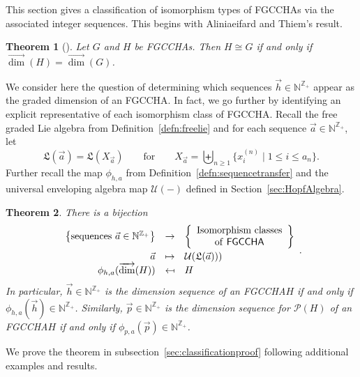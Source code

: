 \documentclass[11pt]{amsart}
\newtheorem{theorem}{Theorem}[section]
\theoremstyle{definition}
\numberwithin{equation}{section}
\def\NN{{\mathbb N}}
\def\ZZ{{\mathbb Z}}
\newcommand{\FGCCHA}{\textsf{FGCCHA}\xspace}
\newcommand{\FGCCHAs}{\textsf{FGCCHA}s\xspace}
\newcommand{\vecdim}{\overrightarrow{\dim}}
\begin{document}
This section gives a classification of isomorphism types of \FGCCHAs via the associated integer sequences.  
This begins with Aliniaeifard and Thiem's result.

\begin{theorem}[{\cite[Theorem 4.2]{AT22}}]
\label{thm:AT}
Let $G$ and $H$ be \FGCCHAs.  Then $H \cong G$ if and only if $\vecdim(H) = \vecdim(G)$.
\end{theorem}

We consider here the question of determining which sequences $\vec{h} \in \NN^{\ZZ_+}$
appear as the graded dimension of an \FGCCHA.  In fact,
we go further by identifying an explicit representative of each isomorphism class of \FGCCHA.  
Recall the free graded Lie algebra from Definition~\ref{defn:freelie} and for each sequence $\vec{a} \in \NN^{\ZZ_{+}}$, let
\begin{equation}
\label{eq:La}
\mathfrak{L}(\vec{a}) = \mathfrak{L}(X_{\vec{a}}) \qquad\text{for}\qquad X_{\vec{a}} = \biguplus_{n \ge 1} \{x^{(n)}_{i} \;|\; 1 \le i \le a_{n}\}.
\end{equation}
Further recall the map $\phi_{h, a}$ from
Definition~\ref{defn:sequencetransfer} and the universal enveloping
algebra map $\mathcal{U}(-)$ defined in Section~\ref{sec:HopfAlgebra}.

\begin{theorem}
\label{thm:a sequence}
There is a bijection
\[
\begin{array}{rcl}
\left\{ \text{sequences }\vec{a} \in \NN^{\ZZ_+} \right\} & \to & \left\{ \begin{array}{c} \text{Isomorphism classes} \\ \text{of \FGCCHA} \end{array} \right\} \\[2ex]
\vec{a} & \mapsto & \mathcal{U}(\mathfrak{L}(\vec{a}))) \\
\phi_{h,a}(\vecdim(H)) & \mapsfrom & H
\end{array}.
\]
In particular, $\vec{h} \in \NN^{\ZZ_+}$ is the dimension sequence of an \FGCCHA $H$ if and only if $\phi_{h, a}(\vec{h}) \in \NN^{\ZZ_+}$.  
Similarly, $\vec{p} \in \NN^{\ZZ_{+}}$ is the dimension sequence for $\mathcal{P}(H)$ of an \FGCCHA $H$ if and only if $\phi_{p, a}(\vec{p}) \in \NN^{\ZZ_{+}}$.
\end{theorem}

We prove the theorem in subsection~\ref{sec:classificationproof} following additional examples and results. 
\end{document}
